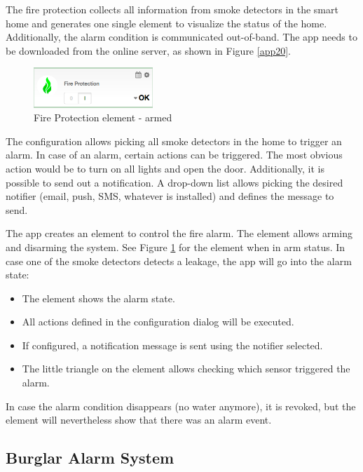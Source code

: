 The fire protection collects all information from smoke detectors in the smart home and 
generates one single element to visualize the status of the home. Additionally, the alarm 
condition is communicated out-of-band. The app needs to be downloaded from the online 
server, as shown in Figure \ref{app20}.

\begin{figure}
\begin{center}
\includegraphics[width=0.4\textwidth]{pngs/cap6/app21.png}
\caption{Fire Protection element - armed}
\label{app21}
\end{center}
\end{figure}


The configuration allows picking all smoke detectors in the home to trigger an alarm. In 
case of an alarm, certain actions can be triggered. The most obvious action would be to 
turn on all lights and open the door.
Additionally, it is possible to send out a notification. A drop-down list allows picking 
the desired notifier (email, push, SMS, whatever is installed) and defines the message to send.

The app creates an element to control the fire alarm. The element allows arming and 
disarming the system. See Figure \ref{app21} for the element when in arm status. In case 
one of the smoke detectors detects a leakage, the app will go into the alarm state:

\begin{itemize}
\item The element shows the alarm state.
\item All actions defined in the configuration dialog will be executed.
\item If configured, a notification message is 
sent using the notifier selected.
\item The little triangle on the element allows checking which sensor triggered the alarm.
\end{itemize}

In case the alarm condition disappears (no water anymore), it is revoked, but the element 
will nevertheless show that there was an alarm event.

\subsection{Burglar Alarm System}


